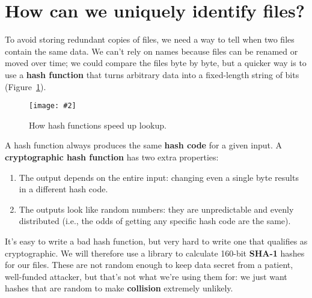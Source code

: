 \documentclass[krantzl]{krantz}
\newcommand{\figpdf}[4]{\begin{figure}%
\centering%
\texttt{[image: \#2]}%
\caption{#3}%
\label{#1}%
\end{figure}}
\newcommand{\figref}[1]{Figure~\ref{#1}}
\newcommand{\glossref}[1]{\textbf{#1}}
\begin{document}
\section{How can we uniquely identify files?}\label{file-backup-unique}


To avoid storing redundant copies of files,
we need a way to tell when two files contain the same data.
We can't rely on names because files can be renamed or moved over time;
we could compare the files byte by byte,
but a quicker way is to use a \glossref{hash function}
that turns arbitrary data into a fixed-length string of bits
(\figref{file-backup-hash-function}).

\figpdf{file-backup-hash-function}{./file-backup/hash-function.pdf}{How hash functions speed up lookup.}{0.6}


A hash function always produces the same \glossref{hash code} for a given input.
A \glossref{cryptographic hash function}
has two extra properties:

\begin{enumerate}

\item 

The output depends on the entire input:
    changing even a single byte results in a different hash code.



\item 

The outputs look like random numbers:
    they are unpredictable and evenly distributed
    (i.e., the odds of getting any specific hash code are the same).



\end{enumerate}


It's easy to write a bad hash function,
but very hard to write one that qualifies as cryptographic.
We will therefore use a library to calculate 160-bit \glossref{SHA-1} hashes for our files.
These are not random enough to keep data secret from a patient, well-funded attacker,
but that's not what we're using them for:
we just want hashes that are random to make \glossref{collision} extremely unlikely.
\end{document}
